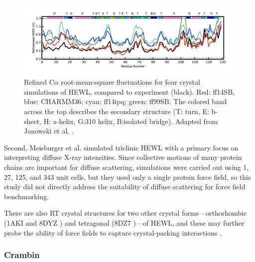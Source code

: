 \documentclass[9pt,review]{livecoms}
\begin{document}
\begin{figure}
    \centering
    \includegraphics[width=\linewidth]{paper/figures/janowski-2016-fig-4c.pdf}
    \caption{Refined C$\alpha$ root-mean-square fluctuations for four crystal simulations of HEWL, compared to experiment (black).
    Red: ff14SB, blue: CHARMM36; cyan: ff14ipq; green: ff99SB. 
    The colored band across the top describes the secondary structure (T: turn, E: b-sheet, H: a-helix, G:310 helix, B:isolated bridge).
    Adapted from Janowski et al. \cite{janowski_molecular_2016}.}
    \label{fig:hewl_xtal_rmsf}
\end{figure}

Second, Meisburger et al. \cite{meisburger_diffuse_2020} simulated triclinic HEWL with a primary focus on interpreting diffuse X-ray intensities.
Since collective motions of many protein chains are important for diffuse scattering, simulations were carried out using 1, 27, 125, and 343 unit cells, but they used only a single protein force field, so this study did not directly address the suitability of diffuse scattering for force field benchmarking.

There are also RT crystal structures for two other crystal forms---orthorhombic (1AKI \cite{artymiuk_structures_1982} and 8DYZ \cite{meisburger_robust_2023}) and tetragonal (8DZ7 \cite{meisburger_robust_2023})---of HEWL, and these may further probe the ability of force fields to capture crystal-packing interactions \cite{meisburger_robust_2023}.

\subsubsection{Crambin}
\label{sub2:crambin}
\end{document}
